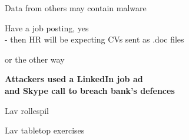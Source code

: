 \documentclass[Screen16to9,17pt]{foils}
\begin{document}
Data from others may contain malware

Have a job posting, yes\\
- then HR will be expecting CVs sent as .doc files

\slide{}

or the other way

{\Large\bf Attackers used a LinkedIn job ad\\
and Skype call to breach bank’s defences}

{\footnotesize
{}}


\begin{list2}
\item Lav rollespil
\item Lav tabletop exercises
\end{list2}



\begin{center}
\hlkbig

\myname

\end{center}
\end{document}
